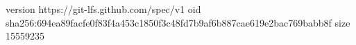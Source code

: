 version https://git-lfs.github.com/spec/v1
oid sha256:694ea89facfe0f83f4a453c1850f3c48fd7b9af6b887cae619e2bac769babb8f
size 15559235

